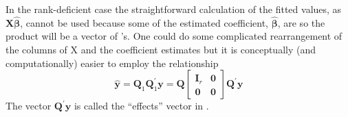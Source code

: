 \documentclass[shortnames,article]{jss}
\begin{document}
In the rank-deficient case the straightforward calculation of the
fitted values, as $\bm X\widehat{\bm\beta}$, cannot be used because
some of the estimated coefficient, $\widehat{\bm\beta}$, are 
so the product will be a vector of 's.  One could do some
complicated rearrangement of the columns of X and the coefficient
estimates but it is conceptually (and computationally) easier to
employ the relationship
\begin{displaymath}
  \widehat{\bm y} = \bm Q_1\bm Q_1^\prime\bm y=\bm Q
  \begin{bmatrix}
    \bm I_r & \bm 0\\
    \bm 0   & \bm 0
  \end{bmatrix}
  \bm Q^\prime\bm y
\end{displaymath}
The vector $\bm Q^\prime\bm y$ is called the ``effects'' vector in .
\end{document}
